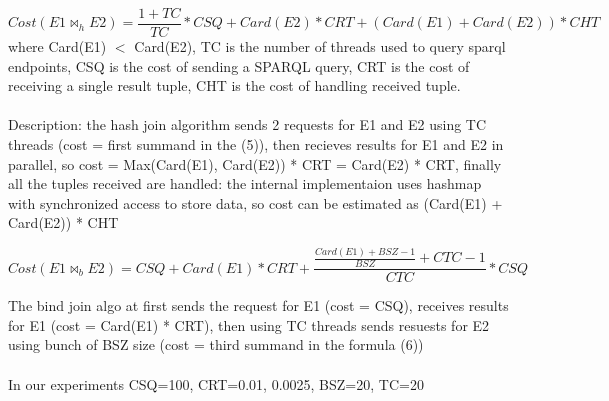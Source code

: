 \documentclass[11pt]{article} %
\begin{document}
\begin{equation}
Cost(E1 \bowtie_h E2) = \frac{1 + TC}{TC} * CSQ + Card(E2) * CRT + (Card(E1)  +  Card(E2)) * CHT
\end{equation}
where Card(E1) $<$ Card(E2), TC is the number of threads used to query sparql endpoints, CSQ is the cost of sending a SPARQL query, CRT is the cost of receiving a single result tuple, CHT is the cost of handling received tuple.\\\\
Description: the hash join algorithm sends 2 requests for E1 and E2 using TC threads (cost = first summand in the (5)), then recieves results for E1 and E2 in parallel, so cost = Max(Card(E1), Card(E2)) * CRT = Card(E2) * CRT, finally all the tuples received are
handled: the internal implementaion uses hashmap with synchronized access to store data, so cost can be estimated as (Card(E1)  +  Card(E2)) * CHT

\begin{equation}
Cost(E1 \bowtie_b E2) = CSQ + Card(E1) * CRT + \frac{\frac{Card(E1) + BSZ - 1}{BSZ} + CTC - 1}{CTC} * CSQ
\end{equation}

The bind join algo at first sends the request for E1 (cost = CSQ), receives results for E1 (cost = Card(E1) * CRT), then using TC threads sends resuests for E2 using bunch of BSZ size (cost = third summand in the formula (6)) \\\\
In our experiments CSQ=100, CRT=0.01, 0.0025, BSZ=20, TC=20
\end{document}
